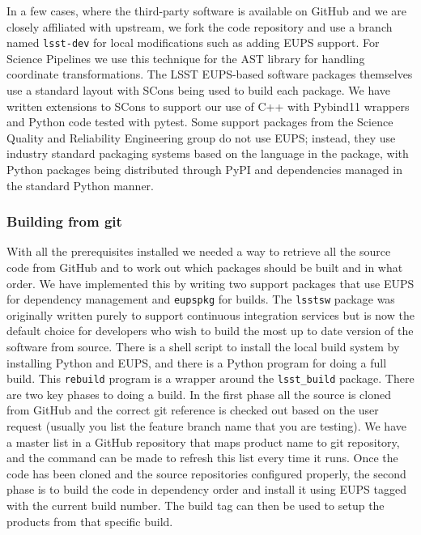 In a few cases, where the third-party software is available on GitHub and we are closely affiliated with upstream, we fork the code repository and use a branch named \texttt{lsst-dev} for local modifications such as adding EUPS support.
For Science Pipelines we use this technique for the AST library\cite{2016A&C....15...33B} for handling coordinate transformations.
The LSST EUPS-based software packages themselves use a standard layout with SCons\cite{2005Scons1377085} being used to build each package.
We have written extensions to SCons to support our use of C++ with Pybind11 wrappers and Python code tested with pytest.
Some support packages from the Science Quality and Reliability Engineering group do not use EUPS; instead, they use industry standard packaging systems based on the language in the package, with Python packages being distributed through PyPI and dependencies managed in the standard Python manner.

\subsubsection{Building from git}

With all the prerequisites installed we needed a way to retrieve all the source code from GitHub and to work out which packages should be built and in what order.
We have implemented this by writing two support packages that use EUPS for dependency management and \texttt{eupspkg} for builds.
The \texttt{lsstsw} package was originally written purely to support continuous integration services but is now the default choice for developers who wish to build the most up to date version of the software from source.
There is a shell script to install the local build system by installing Python and EUPS, and there is a Python program for doing a full build.
This \texttt{rebuild} program is a wrapper around the \texttt{lsst\_build} package.
There are two key phases to doing a build.
In the first phase all the source is cloned from GitHub and the correct git reference is checked out based on the user request (usually you list the feature branch name that you are testing).
We have a master list in a GitHub repository that maps product name to git repository, and the command can be made to refresh this list every time it runs.
Once the code has been cloned and the source repositories configured properly, the second phase is to build the code in dependency order and install it using EUPS tagged with the current build number.
The build tag can then be used to setup the products from that specific build.

